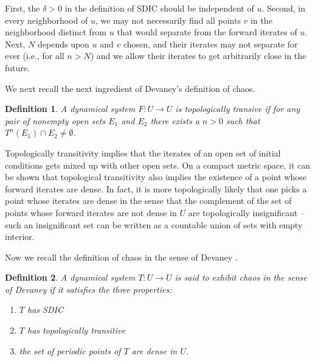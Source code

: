 \documentclass[12 pt]{article}
\newtheorem{Definition}{Definition}[]
\begin{document}
First, the $\delta>0$ in the definition of SDIC should be independent of $u$. Second, in every neighborhood of $u$, we may not necessarily find all points $v$ in the neighborhood distinct from $u$ that would separate from the forward iterates of $u$. Next, $N$ depends upon $u$ and $v$ chosen, and their iterates may not separate for ever (i.e., for all $n>N$) and we allow their iterates to get arbitrarily close in the future. 

 

We next recall the next ingredient of Devaney's definition of chaos.  

\begin{Definition}
	A dynamical system $F: U \to U$ is topologically transive if for any pair of nonempty open sets $E_1$ and $E_2$ there exists a $n>0$ such that $T^n(E_1) \cap E_2 \not= \emptyset$. 
\end{Definition}

Topologically transitivity implies that the iterates of an open set of initial conditions gets mixed up with other open sets. On a compact metric space, it can be shown that topological transitivity also implies the existence of a point whose forward iterates are dense. In fact, it is more topologically likely that one picks a point whose iterates are dense in the sense that the complement of the set of points whose forward iterates are not dense in $U$  are topologically insignificant -- such an insignificant set can be written as a countable union of sets with empty interior. 

Now we recall the definition of chaos in the sense of Devaney \cite{devaney2018introduction}.
\begin{Definition}
	A dynamical system $T: U \to U$ is said to exhibit chaos in the sense of Devaney if it satisfies the three properties:
	\begin{enumerate}
		\item $T$ has SDIC
		\item $T$ has topologically transitive
		\item the set of periodic points of $T$ are dense in $U$. 
	\end{enumerate}
\end{Definition}
\end{document}
